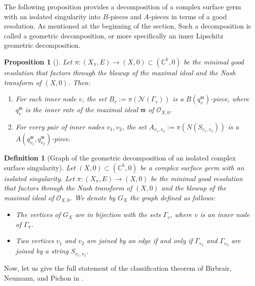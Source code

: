 \documentclass[reqno,dvipsnames,12pt]{amsart}
\newtheorem{prop}[thm]{Proposition}
\newtheorem{defi}[thm]{Definition}
\begin{document}
The following proposition provides a decomposition of a complex surface germ with an isolated singularity into $B$-pieces and $A$-pieces in terms of a good resolution. As mentioned at the beginning of the section, Such a decomposition is called a geometric decomposition, or more specifically an inner Lipschitz geometric decomposition.
\begin{prop}[{\cite[Proposition 7.5.25]{pichonintroduction}}]\label{tropdetrop}
Let $\pi: (X_{\pi},E) \longrightarrow (X,0) \subset (\mathbb{C}^k,0)$ be the minimal good resolution that factors through the blowup of the maximal ideal and the Nash transform of $(X,0)$. Then:  
\begin{enumerate}
    \item For each inner node $v$, the set $B_v := \pi(\mathcal{N}(\Gamma_v))$ is a $B(q_v^{\mathfrak{m}})$-piece, where $q_v^{\mathfrak{m}}$ is the inner rate of the maximal ideal $\mathfrak{m}$ of $\mathcal{O}_{X,0}$.
    \item For every pair of inner nodes $v_1, v_2$, the set $A_{v_1,v_2} := \pi(N(S_{v_1,v_2}))$ is a $A(q_{v_1}^{\mathfrak{m}}, q_{v_2}^{\mathfrak{m}})$-piece.
\end{enumerate}
\end{prop}

\begin{defi}[Graph of the geometric decomposition of an isolated complex surface singularity]
Let $(X,0) \subset (\mathbb{C}^k,0)$ be a complex surface germ with an isolated singularity. Let $\pi: (X_{\pi},E) \longrightarrow (X,0)$ be the minimal good resolution that factors through the Nash transform of $(X,0)$ and the blowup of the maximal ideal of $\mathcal{O}_{X,0}$. We denote by $G_X$ the graph defined as follows:  
\begin{itemize}
    \item The vertices of $G_X$ are in bijection with the sets $\Gamma_v$, where $v$ is an inner node of $\Gamma_{\pi}$.
    \item Two vertices $v_1$ and $v_2$ are joined by an edge if and only if $\Gamma_{v_1}$ and $\Gamma_{v_2}$ are joined by a string $S_{v_1,v_2}$.
\end{itemize}
\end{defi}
Now, let us give the full statement of the classification theorem of Birbrair, Neumann, and Pichon in \cite{BNP}.
\end{document}
